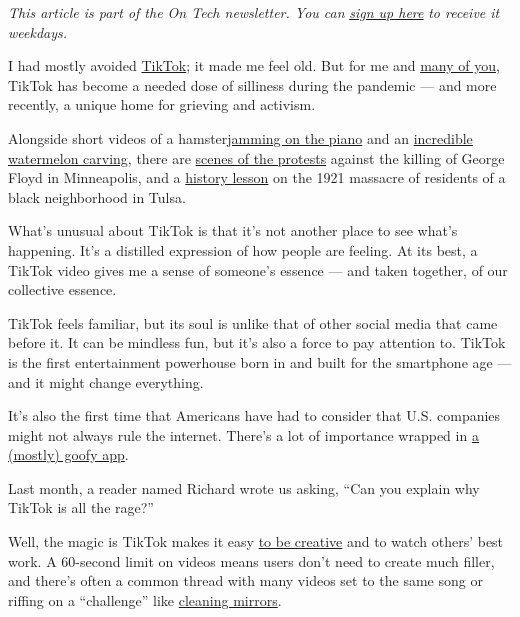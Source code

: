 \emph{This article is part of the On Tech newsletter. You can}
\href{https://www.nytimes3xbfgragh.onion/newsletters/signup/OT}{\emph{sign
up here}} \emph{to receive it weekdays.}

I had mostly avoided
\href{https://www.nytimes3xbfgragh.onion/2020/07/26/technology/tiktok-china-ban-model.html}{TikTok};
it made me feel old. But for me and
\href{https://www.cnn.com/2020/05/05/tech/tiktok-bytedance-coronavirus-intl-hnk/index.html}{many
of you}, TikTok has become a needed dose of silliness during the
pandemic --- and more recently, a unique home for grieving and activism.

Alongside short videos of a
hamster\href{https://www.tiktok.com/@hamstarz/video/6829822490131434757}{jamming
on the piano} and an
\href{https://www.tiktok.com/@cakelover363/video/6824418668445846789?lang=en}{incredible
watermelon carving}, there are
\href{https://www.tiktok.com/@kareemrahma/video/6831762210218446085?lang=US}{scenes
of the protests} against the killing of George Floyd in Minneapolis, and
a
\href{https://www.tiktok.com/@theleftistdude/video/6826796142299254021}{history
lesson} on the 1921 massacre of residents of a black neighborhood in
Tulsa.

What's unusual about TikTok is that it's not another place to see what's
happening. It's a distilled expression of how people are feeling. At its
best, a TikTok video gives me a sense of someone's essence --- and taken
together, of our collective essence.

TikTok feels familiar, but its soul is unlike that of other social media
that came before it. It can be mindless fun, but it's also a force to
pay attention to. TikTok is the first entertainment powerhouse born in
and built for the smartphone age --- and it might change everything.

It's also the first time that Americans have had to consider that U.S.
companies might not always rule the internet. There's a lot of
importance wrapped in
\href{https://www.nytimes3xbfgragh.onion/2019/03/10/style/what-is-tik-tok.html}{a
(mostly) goofy app}.

Last month, a reader named Richard wrote us asking, ``Can you explain
why TikTok is all the rage?''

Well, the magic is TikTok makes it easy
\href{https://www.nytimes3xbfgragh.onion/interactive/2019/10/10/arts/TIK-TOK.html}{to
be creative} and to watch others' best work. A 60-second limit on videos
means users don't need to create much filler, and there's often a common
thread with many videos set to the same song or riffing on a
``challenge'' like
\href{https://www.vulture.com/2020/06/tiktok-wipe-it-down-challenge-bmw-kenny-explainer.html}{cleaning
mirrors}.

